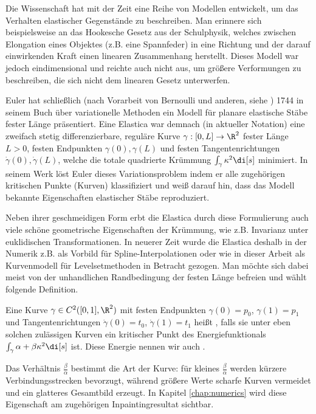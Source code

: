 \documentclass{mythesis}
\begin{document}
Die Wissenschaft hat mit der Zeit eine Reihe von Modellen entwickelt, um das Verhalten elastischer Gegenstände zu beschreiben.
Man erinnere sich beispielsweise an das Hookesche Gesetz aus der Schulphysik, welches zwischen Elongation eines Objektes (z.B. eine Spannfeder) in eine Richtung und der darauf einwirkenden Kraft einen linearen Zusammenhang herstellt.
Dieses Modell war jedoch eindimensional und reichte auch nicht aus, um größere Verformungen zu beschreiben, die sich nicht dem linearen Gesetz unterwerfen.

Euler hat schließlich (nach Vorarbeit von Bernoulli und anderen, siehe \cite{levien2008elastica}) 1744 in seinem Buch über variationelle Methoden \cite{euler1774methodus} ein Modell für planare elastische Stäbe fester Länge präsentiert.
Eine Elastica war demnach (in aktueller Notation) eine zweifach stetig differenzierbare, reguläre Kurve $\gamma: [0,L] \to \R^2$ fester Länge $L > 0$, festen Endpunkten $\gamma(0), \gamma(L)$ und festen Tangentenrichtungen $\dot \gamma(0), \dot \gamma(L)$, welche die totale quadrierte Krümmung
\begin{math}
    \int_\gamma \kappa^2 \di[s]
\end{math}
minimiert.
In seinem Werk löst Euler dieses Variationsproblem indem er alle zugehörigen kritischen Punkte (Kurven) klassifiziert und weiß darauf hin, dass das Modell bekannte Eigenschaften elastischer Stäbe reproduziert.

Neben ihrer geschmeidigen Form erbt die Elastica durch diese Formulierung auch viele schöne geometrische Eigenschaften der Krümmung, wie z.B. Invarianz unter euklidischen Transformationen.
In neuerer Zeit wurde die Elastica deshalb in der Numerik z.B. als Vorbild für Spline-Interpolationen oder wie in dieser Arbeit als Kurvenmodell für Levelsetmethoden in Betracht gezogen.
Man möchte sich dabei meist von der unhandlichen Randbedingung der festen Länge befreien und wählt folgende Definition.

\begin{definition} \label{definition:elastica}
    Eine Kurve $\gamma \in C^2([0,1], \R^2)$ mit festen Endpunkten $\gamma(0) = p_0$, $\gamma(1) = p_1$ und Tangentenrichtungen $\dot\gamma(0) = t_0$, $\dot\gamma(1) = t_1$ heißt , falls sie unter eben solchen zulässigen Kurven ein kritischer Punkt des Energiefunktionals
    \begin{math}
	\int_\gamma \alpha + \beta \kappa^2 \di[s]
    \end{math}
    ist.
    Diese Energie nennen wir auch .
    \begin{note}
	Das Verhältnis $\frac{\beta}{\alpha}$ bestimmt die Art der Kurve: für kleines $\frac{\beta}{\alpha}$ werden kürzere Verbindungsstrecken bevorzugt, während größere Werte scharfe Kurven vermeidet und ein glatteres Gesamtbild erzeugt.
	In Kapitel \ref{chap:numerics} wird diese Eigenschaft am zugehörigen Inpaintingresultat sichtbar.
    \end{note}
\end{definition}
\end{document}
